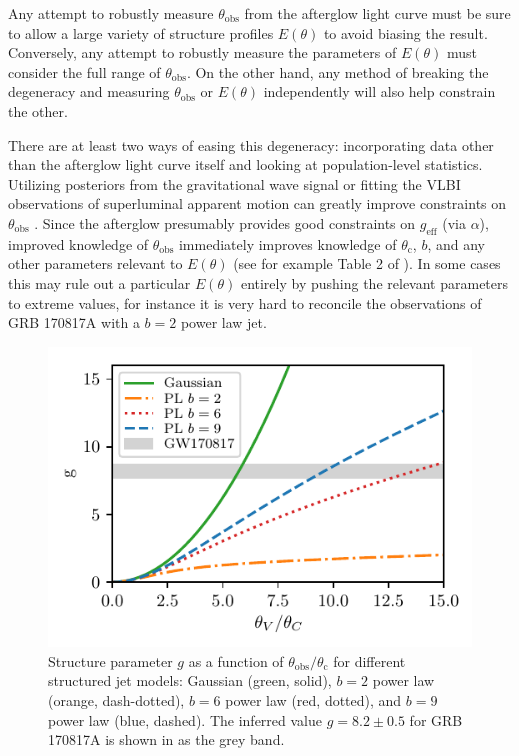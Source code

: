 \documentclass[twocolumn]{aastex62}
\newcommand{\grbbns}{GRB 170817A}
\newcommand{\thobs}{\ensuremath{\theta_{\mathrm{obs}}}}
\newcommand{\thC}{\ensuremath{\theta_{\mathrm{c}}}}
\newcommand{\geff}{\ensuremath{g_{\mathrm{eff}}}}
\begin{document}
Any attempt to robustly measure $\thobs$ from the afterglow light curve must be sure to allow a large variety of structure profiles $E(\theta)$ to avoid biasing the result. Conversely, any attempt to robustly measure the parameters of $E(\theta)$ must consider the full range of $\thobs$. On the other hand, any method of breaking the degeneracy and measuring $\thobs$ or $E(\theta)$ independently will also help constrain the other.

There are at least two ways of easing this degeneracy: incorporating data other than the afterglow light curve itself and looking at population-level statistics.  Utilizing posteriors from the gravitational wave signal or fitting the VLBI observations of superluminal apparent motion can greatly improve constraints on $\thobs$ \citep{Troja:2018aa, Hotokezaka:2018aa, Ghirlanda:2019aa}.  Since the afterglow presumably provides good constraints on $\geff$ (via $\alpha$), improved knowledge of $\thobs$ immediately improves knowledge of $\thC$, $b$, and any other parameters relevant to $E(\theta)$ (see for example Table 2 of \citet{Troja:2018aa}).  In some cases this may rule out a particular $E(\theta)$ entirely by pushing the relevant parameters to extreme values, for instance it is very hard to reconcile the observations of \grbbns{} with a $b=2$ power law jet.

\begin{figure}
	\includegraphics[width=\columnwidth]{figs/g_plot.pdf}
	\caption{Structure parameter $g$ as a function of $\thobs/\thC$ for different structured jet models: Gaussian (green, solid), $b=2$ power law (orange, dash-dotted), $b=6$ power law (red, dotted), and $b=9$ power law (blue, dashed).  The inferred value $g = 8.2\pm0.5$ for \grbbns{} is shown in as the grey band. \label{fig:gPop}}
\end{figure}
\end{document}
